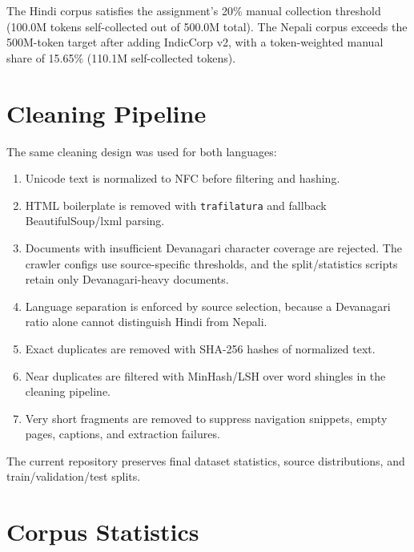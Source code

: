 \documentclass[11pt]{article}
\begin{document}
The Hindi corpus satisfies the assignment's 20\% manual collection threshold (100.0M tokens self-collected out of 500.0M total).
The Nepali corpus exceeds the 500M-token target after adding IndicCorp v2, with
a token-weighted manual share of 15.65\% (110.1M self-collected tokens).

\section{Cleaning Pipeline}
The same cleaning design was used for both languages:
\begin{enumerate}
    \item Unicode text is normalized to NFC before filtering and hashing.
    \item HTML boilerplate is removed with \texttt{trafilatura} and fallback
    BeautifulSoup/lxml parsing.
    \item Documents with insufficient Devanagari character coverage are
    rejected. The crawler configs use source-specific thresholds, and the
    split/statistics scripts retain only Devanagari-heavy documents.
    \item Language separation is enforced by source selection, because a
    Devanagari ratio alone cannot distinguish Hindi from Nepali.
    \item Exact duplicates are removed with SHA-256 hashes of normalized
    text.
    \item Near duplicates are filtered with MinHash/LSH over word shingles in
    the cleaning pipeline.
    \item Very short fragments are removed to suppress navigation snippets,
    empty pages, captions, and extraction failures.
\end{enumerate}

The current repository preserves final dataset statistics, source
distributions, and train/\allowbreak validation/\allowbreak test splits.

\section{Corpus Statistics}

\begin{table}[H]
\centering
\caption{Final corpus statistics}
\end{table}
\end{document}
